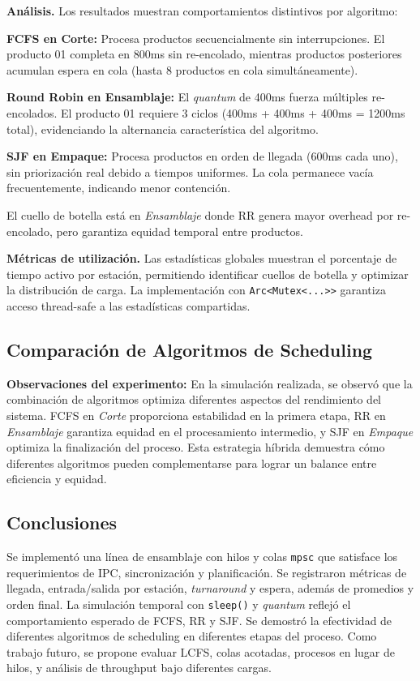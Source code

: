 \documentclass[conference]{IEEEtran}
\begin{document}
\noindent\textbf{Análisis.} Los resultados muestran comportamientos distintivos por algoritmo:

\textbf{FCFS en Corte:} Procesa productos secuencialmente sin interrupciones. El producto 01 completa en 800ms sin re-encolado, mientras productos posteriores acumulan espera en cola (hasta 8 productos en cola simultáneamente).

\textbf{Round Robin en Ensamblaje:} El \textit{quantum} de 400ms fuerza múltiples re-encolados. El producto 01 requiere 3 ciclos (400ms + 400ms + 400ms = 1200ms total), evidenciando la alternancia característica del algoritmo.

\textbf{SJF en Empaque:} Procesa productos en orden de llegada (600ms cada uno), sin priorización real debido a tiempos uniformes. La cola permanece vacía frecuentemente, indicando menor contención.

El cuello de botella está en \textit{Ensamblaje} donde RR genera mayor overhead por re-encolado, pero garantiza equidad temporal entre productos.

\textbf{Métricas de utilización.} Las estadísticas globales muestran el porcentaje de tiempo activo por estación, permitiendo identificar cuellos de botella y optimizar la distribución de carga. La implementación con \texttt{Arc<Mutex<...>>} garantiza acceso thread-safe a las estadísticas compartidas.

\subsection{Comparación de Algoritmos de Scheduling}

\textbf{Observaciones del experimento:} En la simulación realizada, se observó que la combinación de algoritmos optimiza diferentes aspectos del rendimiento del sistema. FCFS en \textit{Corte} proporciona estabilidad en la primera etapa, RR en \textit{Ensamblaje} garantiza equidad en el procesamiento intermedio, y SJF en \textit{Empaque} optimiza la finalización del proceso. Esta estrategia híbrida demuestra cómo diferentes algoritmos pueden complementarse para lograr un balance entre eficiencia y equidad.

\subsection{Conclusiones}
Se implementó una línea de ensamblaje con hilos y colas \texttt{mpsc} que satisface los requerimientos de IPC, sincronización y planificación. Se registraron métricas de llegada, entrada/salida por estación, \textit{turnaround} y espera, además de promedios y orden final. La simulación temporal con \texttt{sleep()} y \textit{quantum} reflejó el comportamiento esperado de FCFS, RR y SJF. Se demostró la efectividad de diferentes algoritmos de scheduling en diferentes etapas del proceso. Como trabajo futuro, se propone evaluar LCFS, colas acotadas, procesos en lugar de hilos, y análisis de throughput bajo diferentes cargas.
\end{document}
